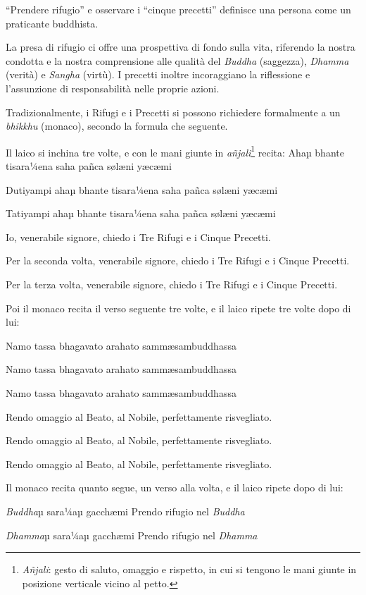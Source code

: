 

``Prendere rifugio'' e osservare i ``cinque precetti'' definisce una persona
come un praticante buddhista.

La presa di rifugio ci offre una prospettiva di fondo sulla vita,
riferendo la nostra condotta e la nostra comprensione alle qualità del
\textit{Buddha} (saggezza), \textit{Dhamma} (verità) e \textit{Sangha} (virtù). I precetti inoltre
incoraggiano la riflessione e l'assunzione di responsabilità nelle
proprie azioni.

Tradizionalmente, i Rifugi e i Precetti si possono richiedere
formalmente a un \textit{bhikkhu} (monaco), secondo la formula che seguente.

Il laico si inchina tre volte, e con le mani giunte in
\textit{añjali}\footnote{\textit{Añjali}: gesto di saluto, omaggio e rispetto, in cui si
tengono le mani giunte in posizione verticale vicino al petto.} recita:
Ahaµ bhante tisara¼ena saha pañca sølæni yæcæmi

Dutiyampi ahaµ bhante tisara¼ena saha pañca sølæni yæcæmi

Tatiyampi ahaµ bhante tisara¼ena saha pañca sølæni yæcæmi

Io, venerabile signore, chiedo i Tre Rifugi e i Cinque Precetti.

Per la seconda volta, venerabile signore, chiedo i Tre Rifugi e i Cinque
Precetti.

Per la terza volta, venerabile signore, chiedo i Tre Rifugi e i Cinque
Precetti.

Poi il monaco recita il verso seguente tre volte, e il laico ripete tre
volte dopo di lui:

Namo tassa bhagavato arahato sammæsambuddhassa

Namo tassa bhagavato arahato sammæsambuddhassa

Namo tassa bhagavato arahato sammæsambuddhassa

Rendo omaggio al Beato, al Nobile, perfettamente risvegliato.

Rendo omaggio al Beato, al Nobile, perfettamente risvegliato.

Rendo omaggio al Beato, al Nobile, perfettamente risvegliato.

Il monaco recita quanto segue, un verso alla volta, e il laico ripete
dopo di lui:

\textit{Buddha}µ sara¼aµ gacchæmi Prendo rifugio nel \textit{Buddha}

\textit{Dhamma}µ sara¼aµ gacchæmi Prendo rifugio nel \textit{Dhamma}


